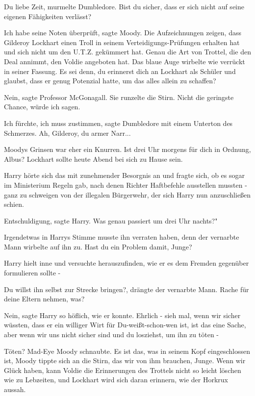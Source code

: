 \glqq{}Du liebe Zeit\grqq{}, murmelte Dumbledore. \glqq{}Bist du sicher, dass er
sich nicht auf seine eigenen Fähigkeiten verlässt?\grqq{}

\glqq{}Ich habe seine Noten überprüft\grqq{}, sagte Moody. \glqq{}Die
Aufzeichnungen zeigen, dass Gilderoy Lockhart einen Troll in seinem
Verteidigungs-Prüfungen erhalten hat und sich nicht um den U.T.Z. gekümmert hat.
Genau die Art von Trottel, die den Deal annimmt, den Voldie angeboten
hat.\grqq{} Das blaue Auge wirbelte wie verrückt in seiner Fassung. \glqq{}Es sei
denn, du erinnerst dich an Lockhart als Schüler und glaubst, dass er genug
Potenzial hatte, um das alles allein zu schaffen?\grqq{}

\glqq{}Nein\grqq{}, sagte Professor McGonagall. Sie runzelte die Stirn. \glqq{}
Nicht die geringste Chance, würde ich sagen.\grqq{}

\glqq{}Ich fürchte, ich muss zustimmen\grqq{}, sagte Dumbledore mit einem
Unterton des Schmerzes. \glqq{}Ah, Gilderoy, du armer Narr...\grqq{}

Moodys Grinsen war eher ein Knurren. \glqq{}Ist drei Uhr morgens für dich in
Ordnung, Albus? Lockhart sollte heute Abend bei sich zu Hause sein.\grqq{}

Harry hörte sich das mit zunehmender Besorgnis an und fragte sich, ob es sogar
im Ministerium Regeln gab, nach denen Richter Haftbefehle ausstellen mussten -
ganz zu schweigen von der illegalen Bürgerwehr, der sich Harry nun anzuschließen
schien.

\glqq{}Entschuldigung\grqq{}, sagte Harry. \glqq{}Was genau passiert um drei Uhr
nachts?"

Irgendetwas in Harrys Stimme musste ihn verraten haben, denn der vernarbte Mann
wirbelte auf ihn zu. \glqq{}Hast du ein Problem damit, Junge?\grqq{}

Harry hielt inne und versuchte herauszufinden, wie er es dem Fremden gegenüber
formulieren sollte -

\glqq{}Du willst ihn selbst zur Strecke bringen?\grqq{}, drängte der vernarbte
Mann. \glqq{}Rache für deine Eltern nehmen, was?\grqq{}

\glqq{}Nein\grqq{}, sagte Harry so höflich, wie er konnte. \glqq{}Ehrlich - sieh
mal, wenn wir sicher wüssten, dass er ein williger Wirt für Du-weißt-schon-wen
ist, ist das eine Sache, aber wenn wir uns nicht sicher sind und du losziehst,
um ihn zu töten -\grqq{}

\glqq{}Töten?\grqq{} Mad-Eye Moody schnaubte. \glqq{}Es ist das, was in seinem
Kopf eingeschlossen ist\grqq{}, Moody tippte sich an die Stirn, \glqq{}das wir
von ihm brauchen, Junge. Wenn wir Glück haben, kann Voldie die Erinnerungen des
Trottels nicht so leicht löschen wie zu Lebzeiten, und Lockhart wird sich daran
erinnern, wie der Horkrux aussah.\grqq{}


